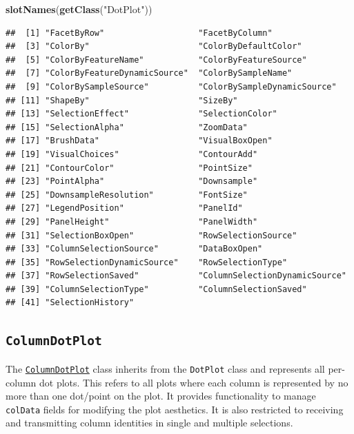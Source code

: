 \documentclass[
]{book}
\newenvironment{Shaded}{\begin{snugshade}}{\end{snugshade}}
\newcommand{\KeywordTok}[1]{\textcolor[rgb]{0.13,0.29,0.53}{\textbf{#1}}}
\newcommand{\NormalTok}[1]{#1}
\newcommand{\StringTok}[1]{\textcolor[rgb]{0.31,0.60,0.02}{#1}}
\begin{document}
\begin{Shaded}
\begin{Highlighting}[]
\KeywordTok{slotNames}\NormalTok{(}\KeywordTok{getClass}\NormalTok{(}\StringTok{"DotPlot"}\NormalTok{))}
\end{Highlighting}
\end{Shaded}

\begin{verbatim}
##  [1] "FacetByRow"                   "FacetByColumn"               
##  [3] "ColorBy"                      "ColorByDefaultColor"         
##  [5] "ColorByFeatureName"           "ColorByFeatureSource"        
##  [7] "ColorByFeatureDynamicSource"  "ColorBySampleName"           
##  [9] "ColorBySampleSource"          "ColorBySampleDynamicSource"  
## [11] "ShapeBy"                      "SizeBy"                      
## [13] "SelectionEffect"              "SelectionColor"              
## [15] "SelectionAlpha"               "ZoomData"                    
## [17] "BrushData"                    "VisualBoxOpen"               
## [19] "VisualChoices"                "ContourAdd"                  
## [21] "ContourColor"                 "PointSize"                   
## [23] "PointAlpha"                   "Downsample"                  
## [25] "DownsampleResolution"         "FontSize"                    
## [27] "LegendPosition"               "PanelId"                     
## [29] "PanelHeight"                  "PanelWidth"                  
## [31] "SelectionBoxOpen"             "RowSelectionSource"          
## [33] "ColumnSelectionSource"        "DataBoxOpen"                 
## [35] "RowSelectionDynamicSource"    "RowSelectionType"            
## [37] "RowSelectionSaved"            "ColumnSelectionDynamicSource"
## [39] "ColumnSelectionType"          "ColumnSelectionSaved"        
## [41] "SelectionHistory"
\end{verbatim}

\hypertarget{columndotplot}{%
\subsection{\texorpdfstring{\texttt{ColumnDotPlot}}{ColumnDotPlot}}\label{columndotplot}}

The \href{https://isee.github.io/iSEE/reference/ColumnDotPlot-class.html}{\texttt{ColumnDotPlot}} class inherits from the \texttt{DotPlot} class and represents all per-column dot plots.
This refers to all plots where each column is represented by no more than one dot/point on the plot.
It provides functionality to manage \texttt{colData} fields for modifying the plot aesthetics.
It is also restricted to receiving and transmitting column identities in single and multiple selections.
\end{document}
